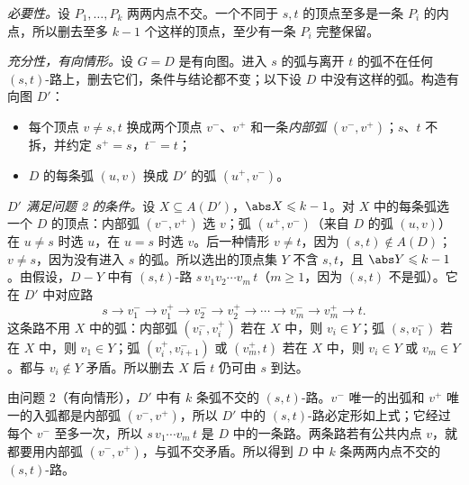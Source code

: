 \begin{solution}
\emph{必要性。}设 $P_1,\dots,P_k$ 两两内点不交。一个不同于 $s,t$ 的顶点至多是一条 $P_i$ 的内点，所以删去至多 $k-1$ 个这样的顶点，至少有一条 $P_i$ 完整保留。

\emph{充分性，有向情形。}设 $G=D$ 是有向图。进入 $s$ 的弧与离开 $t$ 的弧不在任何 $(s,t)$-路上，删去它们，条件与结论都不变；以下设 $D$ 中没有这样的弧。构造有向图 $D'$：
\begin{itemize}
\item 每个顶点 $v\neq s,t$ 换成两个顶点 $v^-$、$v^+$ 和一条\emph{内部弧} $(v^-,v^+)$；$s$、$t$ 不拆，并约定 $s^+=s$，$t^-=t$；
\item $D$ 的每条弧 $(u,v)$ 换成 $D'$ 的弧 $(u^+,v^-)$。
\end{itemize}

\emph{$D'$ 满足问题 2 的条件。}设 $X\subseteq A(D')$，$\abs X\leqslant k-1$。对 $X$ 中的每条弧选一个 $D$ 的顶点：内部弧 $(v^-,v^+)$ 选 $v$；弧 $(u^+,v^-)$（来自 $D$ 的弧 $(u,v)$）在 $u\neq s$ 时选 $u$，在 $u=s$ 时选 $v$。后一种情形 $v\neq t$，因为 $(s,t)\notin A(D)$；$v\neq s$，因为没有进入 $s$ 的弧。所以选出的顶点集 $Y$ 不含 $s,t$，且 $\abs Y\leqslant k-1$。由假设，$D-Y$ 中有 $(s,t)$-路 $s\,v_1v_2\cdots v_m\,t$（$m\geqslant1$，因为 $(s,t)$ 不是弧）。它在 $D'$ 中对应路
\[
s\to v_1^-\to v_1^+\to v_2^-\to v_2^+\to\cdots\to v_m^-\to v_m^+\to t.
\]
这条路不用 $X$ 中的弧：内部弧 $(v_i^-,v_i^+)$ 若在 $X$ 中，则 $v_i\in Y$；弧 $(s,v_1^-)$ 若在 $X$ 中，则 $v_1\in Y$；弧 $(v_i^+,v_{i+1}^-)$ 或 $(v_m^+,t)$ 若在 $X$ 中，则 $v_i\in Y$ 或 $v_m\in Y$。都与 $v_i\notin Y$ 矛盾。所以删去 $X$ 后 $t$ 仍可由 $s$ 到达。

由问题 2（有向情形），$D'$ 中有 $k$ 条弧不交的 $(s,t)$-路。$v^-$ 唯一的出弧和 $v^+$ 唯一的入弧都是内部弧 $(v^-,v^+)$，所以 $D'$ 中的 $(s,t)$-路必定形如上式；它经过每个 $v^-$ 至多一次，所以 $s\,v_1\cdots v_m\,t$ 是 $D$ 中的一条路。两条路若有公共内点 $v$，就都要用内部弧 $(v^-,v^+)$，与弧不交矛盾。所以得到 $D$ 中 $k$ 条两两内点不交的 $(s,t)$-路。


\end{solution}
